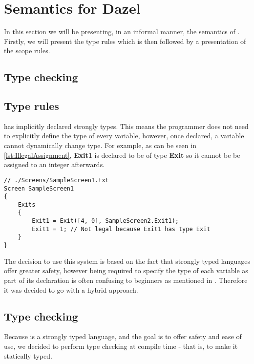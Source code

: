 \section{Semantics for Dazel}

In this section we will be presenting, in an informal manner, the semantics of \dazel.
Firstly, we will present the type rules which is then followed by a presentation of the scope rules.

\subsection*{Type checking}



\subsection*{Type rules}
\dazel has implicitly declared strongly types.
This means the programmer does not need to explicitly define the type of every variable, however, once declared, a variable
cannot dynamically change type.
For example, as can be seen in \ref{lst:IllegalAssignment}, \textbf{Exit1} is declared to be of type \textbf{Exit} so it cannot be be
assigned to an integer afterwards.

\begin{lstlisting}[caption={Example of an illegal assingment}, label={lst:IllegalAssignment},escapechar=|]
// ./Screens/SampleScreen1.txt
Screen SampleScreen1 
{
	Exits 
	{
		Exit1 = Exit([4, 0], SampleScreen2.Exit1);
		Exit1 = 1; // Not legal because Exit1 has type Exit
	}
}
\end{lstlisting}

The decision to use this system is based on the fact that strongly typed languages offer greater safety, however being required to
specify the type of each variable as part of its declaration is often confusing to beginners as mentioned in .
Therefore it was decided to go with a hybrid approach.

\subsection*{Type checking}

Because \dazel is a strongly typed language, and the goal is to offer safety and ease of use, we decided to perform type checking at compile time - that is, to make it
statically typed.